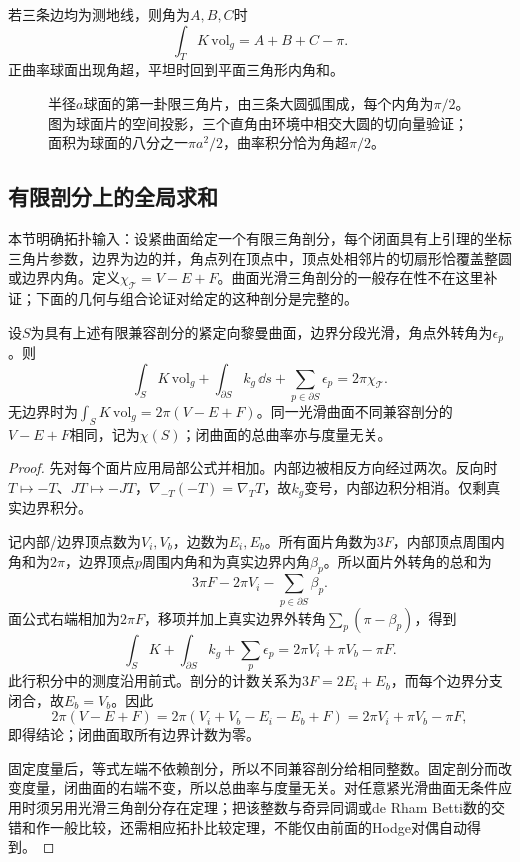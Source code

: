 若三条边均为测地线，则角为$A,B,C$时
\[
 \int_T K\,\mathrm{vol}_g=A+B+C-\pi.
\]
正曲率球面出现角超，平坦时回到平面三角形内角和。
\begin{figure}[htbp]
\centering
\caption{半径$a$球面的第一卦限三角片，由三条大圆弧围成，每个内角为$\pi/2$。图为球面片的空间投影，三个直角由环境中相交大圆的切向量验证；面积为球面的八分之一$\pi a^2/2$，曲率积分恰为角超$\pi/2$。}
\label{fig:gauss-bonnet-octant}
\end{figure}

\subsection*{有限剖分上的全局求和}
本节明确拓扑输入：设紧曲面给定一个有限三角剖分，每个闭面具有上引理的坐标三角片参数，边界为边的并，角点列在顶点中，顶点处相邻片的切扇形恰覆盖整圆或边界内角。定义$\chi_{\mathcal T}=V-E+F$。曲面光滑三角剖分的一般存在性不在这里补证；下面的几何与组合论证对给定的这种剖分是完整的。

\begin{theorem}\label{thm:surface-gauss-bonnet}
设$S$为具有上述有限兼容剖分的紧定向黎曼曲面，边界分段光滑，角点外转角为$\epsilon_p$。则
\[
 \int_S K\,\mathrm{vol}_g+\int_{\partial S}k_g\,\dd s
       +\sum_{p\in\partial S}\epsilon_p=2\pi\chi_{\mathcal T}.
\]
无边界时为$\int_SK\,\mathrm{vol}_g=2\pi(V-E+F)$。同一光滑曲面不同兼容剖分的$V-E+F$相同，记为$\chi(S)$；闭曲面的总曲率亦与度量无关。
\end{theorem}
\begin{proof}
先对每个面片应用局部公式并相加。内部边被相反方向经过两次。反向时$T\mapsto-T$、$JT\mapsto-JT$，$\nabla_{-T}(-T)=\nabla_TT$，故$k_g$变号，内部边积分相消。仅剩真实边界积分。

记内部/边界顶点数为$V_i,V_b$，边数为$E_i,E_b$。所有面片角数为$3F$，内部顶点周围内角和为$2\pi$，边界顶点$p$周围内角和为真实边界内角$\beta_p$。所以面片外转角的总和为
\[
 3\pi F-2\pi V_i-\sum_{p\in\partial S}\beta_p.
\]
面公式右端相加为$2\pi F$，移项并加上真实边界外转角$\sum_p(\pi-\beta_p)$，得到
\[
 \int_SK+\int_{\partial S}k_g+\sum_p\epsilon_p
 =2\pi V_i+\pi V_b-\pi F.
\]
此行积分中的测度沿用前式。剖分的计数关系为$3F=2E_i+E_b$，而每个边界分支闭合，故$E_b=V_b$。因此
\[
 2\pi(V-E+F)=2\pi(V_i+V_b-E_i-E_b+F)
             =2\pi V_i+\pi V_b-\pi F,
\]
即得结论；闭曲面取所有边界计数为零。

固定度量后，等式左端不依赖剖分，所以不同兼容剖分给相同整数。固定剖分而改变度量，闭曲面的右端不变，所以总曲率与度量无关。对任意紧光滑曲面无条件应用时须另用光滑三角剖分存在定理；把该整数与奇异同调或de Rham Betti数的交错和作一般比较，还需相应拓扑比较定理，不能仅由前面的Hodge对偶自动得到。
\end{proof}

